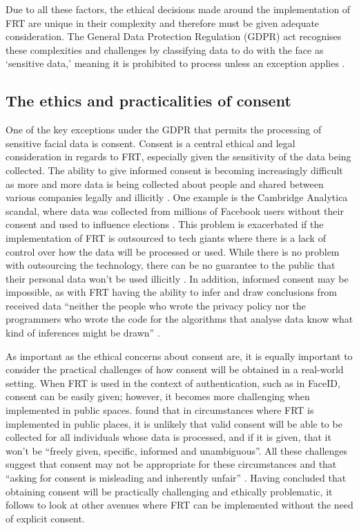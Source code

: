 \documentclass{article}
\begin{document}
Due to all these factors, the ethical decisions made around the implementation of FRT are unique in their complexity and therefore must be given adequate consideration. The General Data Protection Regulation (GDPR) act recognises these complexities and challenges by classifying data to do with the face as ‘sensitive data,’ meaning it is prohibited to process unless an exception applies \cite{KPMG_GDPR}.

\subsection{The ethics and practicalities of consent}
One of the key exceptions under the GDPR that permits the processing of sensitive facial data is consent. Consent is a central ethical and legal consideration in regards to FRT, especially given the sensitivity of the data being collected. The ability to give informed consent is becoming increasingly difficult as more and more data is being collected about people and shared between various companies legally and illicitly \cite{SurveillanceDelusionOxford}. One example is the Cambridge Analytica scandal, where data was collected from millions of Facebook users without their consent and used to influence elections \cite{MATZ2020116}. This problem is exacerbated if the implementation of FRT is outsourced to tech giants where there is a lack of control over how the data will be processed or used. While there is no problem with outsourcing the technology, there can be no guarantee to the public that their personal data won't be used illicitly \cite{SurveillanceDelusionOxford}. In addition, informed consent may be impossible, as with FRT having the ability to infer and draw conclusions from received data \cite{Supervisor2021} “neither the people who wrote the privacy policy nor the programmers who wrote the code for the algorithms that analyse data know what kind of inferences might be drawn” \cite{SurveillanceDelusionOxford}. 

As important as the ethical concerns about consent are, it is equally important to consider the practical challenges of how consent will be obtained in a real-world setting. When FRT is used in the context of authentication, such as in FaceID, consent can be easily given; however, it becomes more challenging when implemented in public spaces. \cite{IOC_LiveFRT} found that in circumstances where FRT is implemented in public places, it is unlikely that valid consent will be able to be collected for all individuals whose data is processed, and if it is given, that it won't be “freely given, specific, informed and unambiguous”. All these challenges suggest that consent may not be appropriate for these circumstances and that “asking for consent is misleading and inherently unfair” \cite{IOC_LiveFRT}. Having concluded that obtaining consent will be practically challenging and ethically problematic, it follows to look at other avenues where FRT can be implemented without the need of explicit consent.
\end{document}

